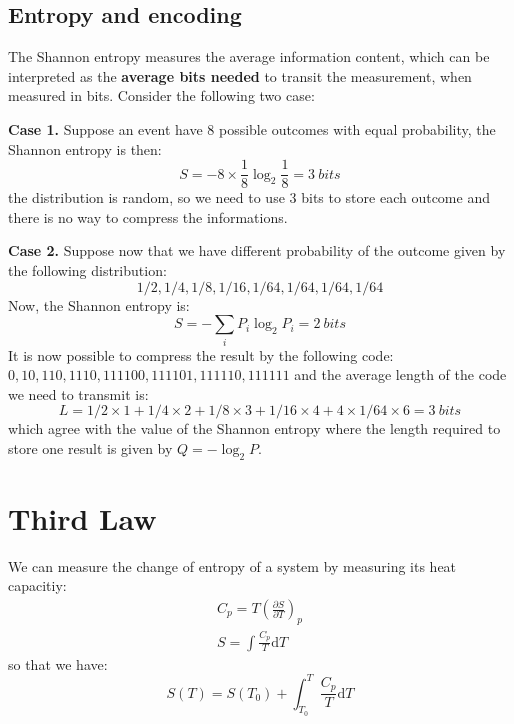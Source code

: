 \documentclass{article}
\newcommand{\pfrac}[2]{\frac{\partial #1}{\partial #2}}
\newcommand{\dnor}{\text{d}}
\begin{document}
\subsection{Entropy and encoding}
The Shannon entropy measures the average information content, which can be interpreted as the \textbf{average bits needed} to
transit the measurement, when measured in bits. Consider the following two case:

\textbf{Case 1.} Suppose an event have 8 possible outcomes with equal probability, 
the Shannon entropy is then:
\begin{equation}
    S = - 8 \times \frac{1}{8} \log_2\frac{1}{8} = 3\ bits
\end{equation}
the distribution is random, so we need to use 3 bits to store each outcome and there is no way to compress the informations.

\textbf{Case 2.} Suppose now that we have different probability of the outcome given by the following distribution:
\begin{equation*}
    {1/2, 1/4, 1/8, 1/16, 1/64, 1/64, 1/64, 1/64}
\end{equation*}
Now, the Shannon entropy is:
\begin{equation}
    S = - \sum_i P_i \log_2 P_i = 2\ bits
\end{equation}
It is now possible to compress the result by the following code: $0, 10, 110, 1110, 111100, 111101, 111110, 111111$ and the average length
of the code we need to transmit is:
\begin{equation}
    L = 1/2 \times 1 + 1/4 \times 2 + 1/8 \times 3 + 1/16 \times 4 + 4 \times 1/64 \times 6= 3\ bits
\end{equation}
which agree with the value of the Shannon entropy where the length required to store one result is given by $Q = - \log_2 P$.

\section{Third Law}
We can measure the change of entropy of a system by measuring its heat capacitiy:
\begin{gather}
    C_p = T\left(\pfrac{S}{T}\right)_p \label{thirdlawcp}\\
    S = \int \frac{C_p}{T} \dnor T
\end{gather}
so that we have:
\begin{equation}
    S(T) = S(T_0) + \int_{T_0}^{T} \frac{C_p}{T} \dnor T
\end{equation}
\end{document}
